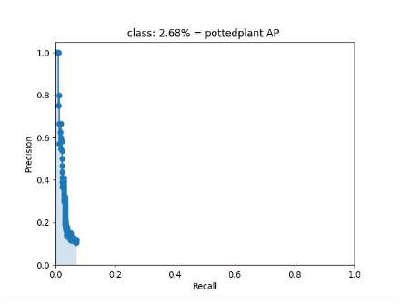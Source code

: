 \documentclass{article}%
\begin{document}
\begin{figure}[H]
\begin{minipage}{0.24\linewidth}
	\end{minipage}
    \begin{minipage}{0.24\linewidth}
		\centering
		\includegraphics[width=0.9\linewidth]{fast_rcnn/mAP_output/classes/pottedplant.png}
	\end{minipage}
\end{figure}
\end{document}
